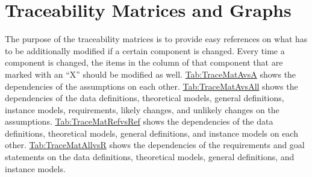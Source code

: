 \documentclass[12pt]{article}
\begin{document}
\section{Traceability Matrices and Graphs}
\label{Sec:TraceMatrices}
The purpose of the traceability matrices is to provide easy references on what has to be additionally modified if a certain component is changed. Every time a component is changed, the items in the column of that component that are marked with an ``X'' should be modified as well. \hyperref[Table:TraceMatAvsA]{Tab:TraceMatAvsA} shows the dependencies of the assumptions on each other. \hyperref[Table:TraceMatAvsAll]{Tab:TraceMatAvsAll} shows the dependencies of the data definitions, theoretical models, general definitions, instance models, requirements, likely changes, and unlikely changes on the assumptions. \hyperref[Table:TraceMatRefvsRef]{Tab:TraceMatRefvsRef} shows the dependencies of the data definitions, theoretical models, general definitions, and instance models on each other. \hyperref[Table:TraceMatAllvsR]{Tab:TraceMatAllvsR} shows the dependencies of the requirements and goal statements on the data definitions, theoretical models, general definitions, and instance models.
\end{document}
